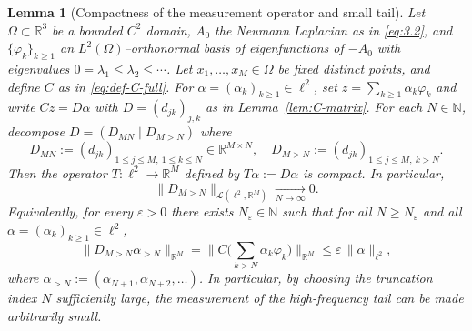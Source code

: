 \documentclass[11pt,a4paper]{article}
\numberwithin{equation}{section}
\newtheorem{lemma}[theorem]{Lemma}
\theoremstyle{definition}
\newcommand{\1}{\mathbbm{1}}
\begin{document}
\begin{lemma}[Compactness of the measurement operator and small tail]
\label{lem:tail-small-compact}
Let $\Omega\subset\mathbb{R}^3$ be a bounded $C^2$ domain, $A_0$ the Neumann
Laplacian as in \eqref{eq:3.2}, and $\{\varphi_k\}_{k\ge1}$ an
$L^2(\Omega)$–orthonormal basis of eigenfunctions of $-A_0$ with eigenvalues
$0=\lambda_1\le\lambda_2\le\cdots$. Let $x_1,\dots,x_M\in\Omega$ be fixed
distinct points, and define $C$ as in \eqref{eq:def-C-full}.
\newline
For $\alpha=(\alpha_k)_{k\ge1}\in\ell^2$, set $z=\sum_{k\ge1}\alpha_k\varphi_k$
and write $Cz=D\alpha$ with $D=(d_{jk})_{j,k}$ as in
Lemma~\ref{lem:C-matrix}. For each $N\in\mathbb{N}$, decompose
$D=(D_{MN}\mid D_{M> N})$ where
\[
D_{MN} := (d_{jk})_{1\le j\le M,\ 1\le k\le N}\in\mathbb{R}^{M\times N},\quad
D_{M> N} := (d_{jk})_{1\le j\le M,\ k>N}.
\]
\noindent
Then the operator $T:\ell^2\to\mathbb{R}^M$ defined by $T\alpha:=D\alpha$ is
compact. In particular,
\begin{equation}
\label{eq:Dtail-norm->0}
\|D_{M> N}\|_{\mathcal{L}(\ell^2,\mathbb{R}^M)} \xrightarrow[N\to\infty]{} 0.
\end{equation}
Equivalently, for every $\varepsilon>0$ there exists $N_\varepsilon\in\mathbb{N}$
such that for all $N\ge N_\varepsilon$ and all
$\alpha=(\alpha_k)_{k\ge1}\in\ell^2$,
\[
\big\|D_{M> N}\alpha_{>N}\big\|_{\mathbb{R}^M}
= \big\|C\Big( \sum_{k>N}\alpha_k\varphi_k \Big)\big\|_{\mathbb{R}^M}
\le \varepsilon\,\|\alpha\|_{\ell^2},
\]
where $\alpha_{>N} := (\alpha_{N+1},\alpha_{N+2},\dots)$.
In particular, by choosing the truncation index $N$ sufficiently large, the
measurement of the high-frequency tail can be made arbitrarily small.
\end{lemma}
\end{document}
